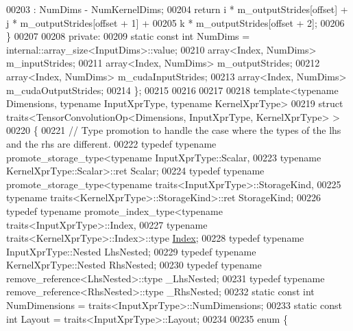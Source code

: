 \begin{DoxyCode}
00203                               : NumDims - NumKernelDims;
00204     \textcolor{keywordflow}{return} i * m\_outputStrides[offset] + j * m\_outputStrides[offset + 1] +
00205            k * m\_outputStrides[offset + 2];
00206   \}
00207 
00208  \textcolor{keyword}{private}:
00209   \textcolor{keyword}{static} \textcolor{keyword}{const} \textcolor{keywordtype}{int} NumDims = internal::array\_size<InputDims>::value;
00210   array<Index, NumDims> m\_inputStrides;
00211   array<Index, NumDims> m\_outputStrides;
00212   array<Index, NumDims> m\_cudaInputStrides;
00213   array<Index, NumDims> m\_cudaOutputStrides;
00214 \};
00215 
00216 
00217 
00218 \textcolor{keyword}{template}<\textcolor{keyword}{typename} Dimensions, \textcolor{keyword}{typename} InputXprType, \textcolor{keyword}{typename} KernelXprType>
00219 \textcolor{keyword}{struct }traits<TensorConvolutionOp<Dimensions, InputXprType, KernelXprType> >
00220 \{
00221   \textcolor{comment}{// Type promotion to handle the case where the types of the lhs and the rhs are different.}
00222   \textcolor{keyword}{typedef} \textcolor{keyword}{typename} promote\_storage\_type<\textcolor{keyword}{typename} InputXprType::Scalar,
00223                                         \textcolor{keyword}{typename} KernelXprType::Scalar>::ret Scalar;
00224   \textcolor{keyword}{typedef} \textcolor{keyword}{typename} promote\_storage\_type<typename traits<InputXprType>::StorageKind,
00225                                         \textcolor{keyword}{typename} traits<KernelXprType>::StorageKind>::ret StorageKind;
00226   \textcolor{keyword}{typedef} \textcolor{keyword}{typename} promote\_index\_type<typename traits<InputXprType>::Index,
00227                                       \textcolor{keyword}{typename} traits<KernelXprType>::Index>::type 
      \hyperlink{namespace_eigen_a62e77e0933482dafde8fe197d9a2cfde}{Index};
00228   \textcolor{keyword}{typedef} \textcolor{keyword}{typename} InputXprType::Nested LhsNested;
00229   \textcolor{keyword}{typedef} \textcolor{keyword}{typename} KernelXprType::Nested RhsNested;
00230   \textcolor{keyword}{typedef} \textcolor{keyword}{typename} remove\_reference<LhsNested>::type \_LhsNested;
00231   \textcolor{keyword}{typedef} \textcolor{keyword}{typename} remove\_reference<RhsNested>::type \_RhsNested;
00232   \textcolor{keyword}{static} \textcolor{keyword}{const} \textcolor{keywordtype}{int} NumDimensions = traits<InputXprType>::NumDimensions;
00233   \textcolor{keyword}{static} \textcolor{keyword}{const} \textcolor{keywordtype}{int} Layout = traits<InputXprType>::Layout;
00234 
00235   \textcolor{keyword}{enum} \{

\end{DoxyCode}
